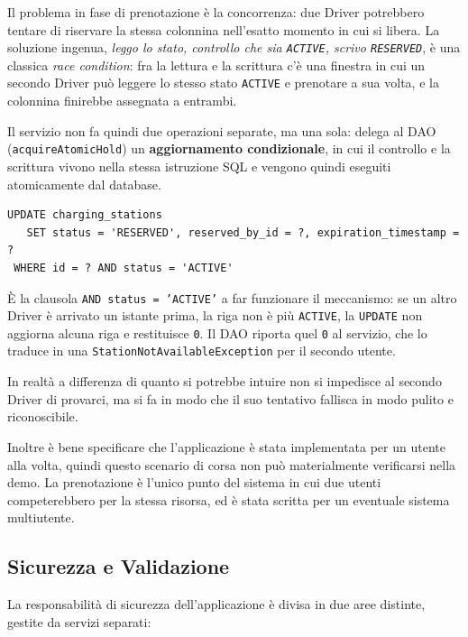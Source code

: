 Il problema in fase di prenotazione è la concorrenza: due Driver potrebbero tentare di riservare la stessa colonnina nell'esatto momento in cui si libera. La soluzione ingenua, \emph{leggo lo stato, controllo che sia \texttt{ACTIVE}, scrivo \texttt{RESERVED}}, è una classica \textit{race condition}: fra la lettura e la scrittura c'è una finestra in cui un secondo Driver può leggere lo stesso stato \texttt{ACTIVE} e prenotare a sua volta, e la colonnina finirebbe assegnata a entrambi.

Il servizio non fa quindi due operazioni separate, ma una sola: delega al DAO (\texttt{acquireAtomicHold}) un \textbf{aggiornamento condizionale}, in cui il controllo e la scrittura vivono nella stessa istruzione SQL e vengono quindi eseguiti atomicamente dal database.

\vspace{0.3cm}
\noindent\begin{minipage}{\linewidth}
\begin{lstlisting}[caption={La condizione di guardia vive dentro la UPDATE}]
UPDATE charging_stations
   SET status = 'RESERVED', reserved_by_id = ?, expiration_timestamp = ?
 WHERE id = ? AND status = 'ACTIVE'
\end{lstlisting}
\end{minipage}
\vspace{0.3cm}

È la clausola \texttt{AND status = 'ACTIVE'} a far funzionare il meccanismo: se un altro Driver è arrivato un istante prima, la riga non è più \texttt{ACTIVE}, la \texttt{UPDATE} non aggiorna alcuna riga e restituisce \texttt{0}. Il DAO riporta quel \texttt{0} al servizio, che lo traduce in una \texttt{StationNotAvailable\allowbreak Exception} per il secondo utente.

In realtà a differenza di quanto si potrebbe intuire non si impedisce al secondo Driver di provarci, ma si fa in modo che il suo tentativo fallisca in modo pulito e riconoscibile. 

Inoltre è bene specificare che l'applicazione è stata implementata per un utente alla volta, quindi questo scenario di corsa non può materialmente verificarsi nella demo. La prenotazione è l'unico punto del sistema in cui due utenti competerebbero per la stessa risorsa, ed è stata scritta per un eventuale sistema multiutente.

\subsection{Sicurezza e Validazione}
\label{subsec:validazione}
La responsabilità di sicurezza dell'applicazione è divisa in due aree distinte, gestite da servizi separati:

